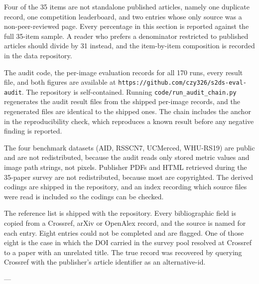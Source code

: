 \documentclass[pdflatex,sn-nature]{sn-jnl}
\begin{document}
Four of the 35 items are not standalone published articles, namely one duplicate record, one competition leaderboard, and two entries whose only source was a non-peer-reviewed page. Every percentage in this section is reported against the full 35-item sample. A reader who prefers a denominator restricted to published articles should divide by 31 instead, and the item-by-item composition is recorded in the data repository.


The audit code, the per-image evaluation records for all 170 runs, every result file, and both figures are available at \texttt{https://github.com/czy326/s2ds-eval-audit}. The repository is self-contained. Running \texttt{code/run\_\allowbreak audit\_\allowbreak chain.py} regenerates the audit result files from the shipped per-image records, and the regenerated files are identical to the shipped ones. The chain includes the anchor in the reproducibility check, which reproduces a known result before any negative finding is reported.

The four benchmark datasets (AID, RSSCN7, UCMerced, WHU-RS19) are public and are not redistributed, because the audit reads only stored metric values and image path strings, not pixels. Publisher PDFs and HTML retrieved during the 35-paper survey are not redistributed, because most are copyrighted. The derived codings are shipped in the repository, and an index recording which source files were read is included so the codings can be checked.

The reference list is shipped with the repository. Every bibliographic field is copied from a Crossref, arXiv or OpenAlex record, and the source is named for each entry. Eight entries could not be completed and are flagged. One of those eight is the case in which the DOI carried in the survey pool resolved at Crossref to a paper with an unrelated title. The true record was recovered by querying Crossref with the publisher's article identifier as an alternative-id.

---
\end{document}
